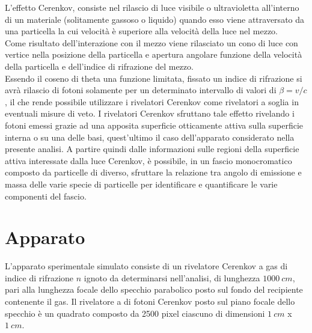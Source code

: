 \documentclass[8pt]{extarticle}
\begin{document}
L'effetto Cerenkov, consiste nel rilascio di luce visibile o ultravioletta all'interno di un materiale (solitamente gassoso o liquido) quando esso viene attraversato da una
particella la cui velocità è superiore alla velocità della luce nel mezzo.\\
Come risultato dell'interazione con il mezzo viene rilasciato un cono di luce con vertice nella posizione della particella e apertura angolare funzione della velocità della particella e dell'indice di rifrazione del mezzo.\\
Essendo il coseno di theta una funzione limitata, fissato un indice di rifrazione si avrà rilascio di fotoni solamente per un determinato intervallo di valori di $\beta=v/c$, il che rende possibile utilizzare i rivelatori Cerenkov come rivelatori a soglia in eventuali misure di veto.
I rivelatori Cerenkov sfruttano tale effetto rivelando i fotoni emessi grazie ad una apposita superficie otticamente attiva sulla superficie interna o su una delle basi, quest'ultimo il caso dell'apparato considerato nella presente analisi.
A partire quindi dalle informazioni sulle regioni della superficie attiva interessate dalla luce Cerenkov, è possibile, in un fascio monocromatico composto da particelle di diverso, sfruttare la relazione tra angolo di emissione e massa delle varie specie di particelle per identificare e quantificare le varie componenti del fascio.

\section{Apparato}
L'apparato sperimentale simulato consiste di un rivelatore Cerenkov a gas di indice di rifrazione $n$ ignoto da determinarsi nell'analisi, di lunghezza $1000 \ cm$, pari alla lunghezza focale dello specchio parabolico posto sul fondo del recipiente contenente il gas. Il rivelatore a di fotoni Cerenkov posto sul piano focale dello specchio è un quadrato composto da 2500 pixel ciascuno di dimensioni $1 \ cm$ x $1 \ cm$. \\
\end{document}
